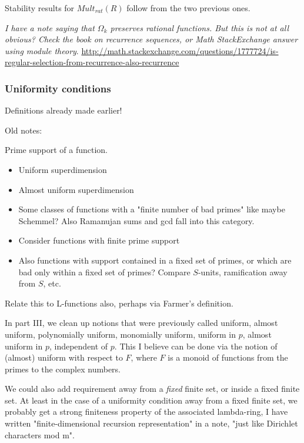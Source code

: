 \documentclass[a4paper]{article}
\begin{document}
\begin{remark}
Stability results for $Mult_{rat}(R)$ follow from the two previous ones.
\end{remark}




\emph{I have a note saying that $\Omega_k$ preserves rational functions. But this is not at all obvious? Check the book on recurrence sequences, or Math StackExchange answer using module theory}.
\url{http://math.stackexchange.com/questions/1777724/is-regular-selection-from-recurrence-also-recurrence}


\subsubsection{Uniformity conditions}

Definitions already made earlier!

Old notes:


\begin{definition}
Prime support of a function.
\end{definition}

\begin{itemize}
\item Uniform superdimension
\item Almost uniform superdimension
\item Some classes of functions with a "finite number of bad primes" like maybe Schemmel? Also Ramanujan sums and gcd fall into this category.
\item Consider functions with finite prime support
\item Also functions with support contained in a fixed set of primes, or which are bad only within a fixed set of primes? Compare $S$-units, ramification away from $S$, etc. 
\end{itemize}
Relate this to L-functions also, perhaps via Farmer's definition.



In part III, we clean up notions that were previously called uniform, almost uniform, polynomially uniform, monomially uniform, uniform in $p$, almost uniform in $p$, independent of $p$. This I believe can be done via the notion of (almost) uniform with respect to $F$, where $F$ is a monoid of functions from the primes to the complex numbers. 

We could also add requirement away from a \emph{fixed} finite set, or inside a fixed finite set. At least in the case of a uniformity condition away from a fixed finite set, we probably get a strong finiteness property of the associated lambda-ring, I have written "finite-dimensional recursion representation" in a note, "just like Dirichlet characters mod m". 
\end{document}
